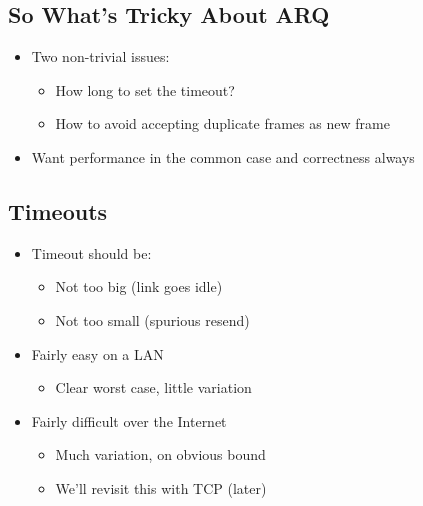 \documentclass[12pt]{ctexart}   %
\begin{document}
	\subsection{So What's Tricky About ARQ}
	\begin{itemize}
		\item Two non-trivial issues:
		\begin{itemize}
			\item How long to set the timeout?
			\item How to avoid accepting duplicate frames as new frame
		\end{itemize}
		
		\item Want performance in the common case and correctness always
	\end{itemize}
	
	\subsection{Timeouts}
	\begin{itemize}
		\item Timeout should be:
		\begin{itemize}
			\item Not too big (link goes idle)
			\item Not too small (spurious resend)
		\end{itemize}
		
		\item Fairly easy on a LAN
		\begin{itemize}
			\item Clear worst case, little variation
		\end{itemize}
		
		\item Fairly difficult over the Internet
		\begin{itemize}
			\item Much variation, on obvious bound
			\item We'll revisit this with TCP (later)
		\end{itemize}
	\end{itemize}
	
\end{document}
